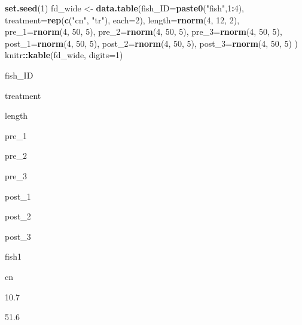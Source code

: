 \documentclass[]{book}
\newenvironment{Shaded}{\begin{snugshade}}{\end{snugshade}}
\newcommand{\KeywordTok}[1]{\textcolor[rgb]{0.13,0.29,0.53}{\textbf{#1}}}
\newcommand{\DataTypeTok}[1]{\textcolor[rgb]{0.13,0.29,0.53}{#1}}
\newcommand{\DecValTok}[1]{\textcolor[rgb]{0.00,0.00,0.81}{#1}}
\newcommand{\StringTok}[1]{\textcolor[rgb]{0.31,0.60,0.02}{#1}}
\newcommand{\OperatorTok}[1]{\textcolor[rgb]{0.81,0.36,0.00}{\textbf{#1}}}
\newcommand{\NormalTok}[1]{#1}
\begin{document}
\begin{Shaded}
\begin{Highlighting}[]
\KeywordTok{set.seed}\NormalTok{(}\DecValTok{1}\NormalTok{)}
\NormalTok{fd_wide <-}\StringTok{ }\KeywordTok{data.table}\NormalTok{(}\DataTypeTok{fish_ID=}\KeywordTok{paste0}\NormalTok{(}\StringTok{"fish"}\NormalTok{,}\DecValTok{1}\OperatorTok{:}\DecValTok{4}\NormalTok{),}
                      \DataTypeTok{treatment=}\KeywordTok{rep}\NormalTok{(}\KeywordTok{c}\NormalTok{(}\StringTok{"cn"}\NormalTok{, }\StringTok{"tr"}\NormalTok{), }\DataTypeTok{each=}\DecValTok{2}\NormalTok{),}
                      \DataTypeTok{length=}\KeywordTok{rnorm}\NormalTok{(}\DecValTok{4}\NormalTok{, }\DecValTok{12}\NormalTok{, }\DecValTok{2}\NormalTok{),}
                      \DataTypeTok{pre_1=}\KeywordTok{rnorm}\NormalTok{(}\DecValTok{4}\NormalTok{, }\DecValTok{50}\NormalTok{, }\DecValTok{5}\NormalTok{),}
                      \DataTypeTok{pre_2=}\KeywordTok{rnorm}\NormalTok{(}\DecValTok{4}\NormalTok{, }\DecValTok{50}\NormalTok{, }\DecValTok{5}\NormalTok{),}
                      \DataTypeTok{pre_3=}\KeywordTok{rnorm}\NormalTok{(}\DecValTok{4}\NormalTok{, }\DecValTok{50}\NormalTok{, }\DecValTok{5}\NormalTok{),}
                      \DataTypeTok{post_1=}\KeywordTok{rnorm}\NormalTok{(}\DecValTok{4}\NormalTok{, }\DecValTok{50}\NormalTok{, }\DecValTok{5}\NormalTok{),}
                      \DataTypeTok{post_2=}\KeywordTok{rnorm}\NormalTok{(}\DecValTok{4}\NormalTok{, }\DecValTok{50}\NormalTok{, }\DecValTok{5}\NormalTok{),}
                      \DataTypeTok{post_3=}\KeywordTok{rnorm}\NormalTok{(}\DecValTok{4}\NormalTok{, }\DecValTok{50}\NormalTok{, }\DecValTok{5}\NormalTok{)}
\NormalTok{                      )}
\NormalTok{knitr}\OperatorTok{::}\KeywordTok{kable}\NormalTok{(fd_wide, }\DataTypeTok{digits=}\DecValTok{1}\NormalTok{)}
\end{Highlighting}
\end{Shaded}

fish\_ID

treatment

length

pre\_1

pre\_2

pre\_3

post\_1

post\_2

post\_3

fish1

cn

10.7

51.6
\end{document}
